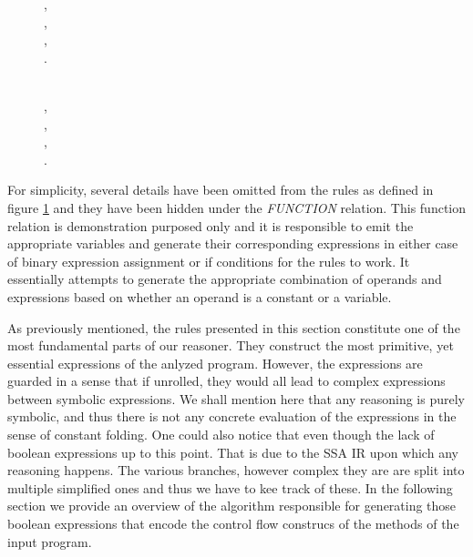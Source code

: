 \begin{figure}[th]
\begin{minipage}{.55\textwidth}
{      },\\
    ,\\
    ,\\
    .
  \end{minipage}
  \begin{minipage}{.46\textwidth}
     \\
    ,\\
    ,\\
    ,\\
    .
  \end{minipage}
  \label{fig:bin-ass-if-cond}
\end{figure}

For simplicity, several details have been omitted from the rules as defined in
figure \ref{fig:bin-ass-if-cond} and they have been hidden under the \emph{FUNCTION} relation.
This function relation is demonstration purposed only and it is responsible to emit
the appropriate variables and generate their corresponding expressions in either
case of binary expression assignment or if conditions for the rules to work.
It essentially attempts to generate the appropriate combination of operands
and expressions based on whether an operand is a constant or a variable.


As previously mentioned, the rules presented in this section constitute
one of the most fundamental parts of our reasoner. They construct the
most primitive, yet essential expressions of the anlyzed program. However,
the expressions are guarded in a sense that if unrolled, they would all
lead to complex expressions between symbolic expressions. We shall mention
here that any reasoning is purely symbolic, and thus there is not any concrete
evaluation of the expressions in the sense of constant folding. One could also
notice that even though the lack of boolean expressions up to this point. That
is due to the SSA IR upon which any reasoning happens. The various branches,
however complex they are are split into multiple simplified ones and thus we
have to kee track of these. In the following section we provide an overview of
the algorithm responsible for generating those boolean expressions that encode
the control flow construcs of the methods of the input program.

